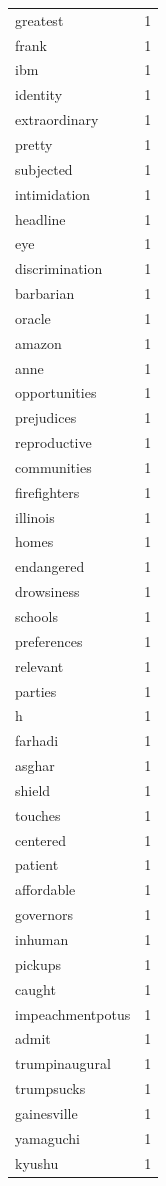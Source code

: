 \begin{tabular}{lr}
greatest & 1 \\
frank & 1 \\
ibm & 1 \\
identity & 1 \\
extraordinary & 1 \\
pretty & 1 \\
subjected & 1 \\
intimidation & 1 \\
headline & 1 \\
eye & 1 \\
discrimination & 1 \\
barbarian & 1 \\
oracle & 1 \\
amazon & 1 \\
anne & 1 \\
opportunities & 1 \\
prejudices & 1 \\
reproductive & 1 \\
communities & 1 \\
firefighters & 1 \\
illinois & 1 \\
homes & 1 \\
endangered & 1 \\
drowsiness & 1 \\
schools & 1 \\
preferences & 1 \\
relevant & 1 \\
parties & 1 \\
h & 1 \\
farhadi & 1 \\
asghar & 1 \\
shield & 1 \\
touches & 1 \\
centered & 1 \\
patient & 1 \\
affordable & 1 \\
governors & 1 \\
inhuman & 1 \\
pickups & 1 \\
caught & 1 \\
impeachmentpotus & 1 \\
admit & 1 \\
trumpinaugural & 1 \\
trumpsucks & 1 \\
gainesville & 1 \\
yamaguchi & 1 \\
kyushu & 1 \\

\end{tabular}
